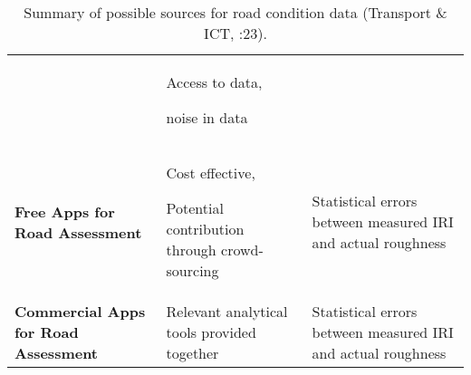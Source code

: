 \begin{table}[]
{\begin{tabular}{p{2.8cm}p{4.6cm}p{4.6cm}}
     & 
     
      Access to data,
     
     
      noise in data
     
     \\
    \textbf{Free Apps \newline for Road Assessment} & 
     
      Cost effective,
     
     
      Potential contribution through crowd-sourcing
     
     &
     
      Statistical errors between measured IRI and actual roughness
     
     \\
    \textbf{Commercial Apps for Road Assessment} & 
     
      Relevant analytical tools provided together
     
     & 
     
      Statistical errors between measured IRI and actual roughness
     
     \\
    \bottomrule
    
    
    
    \end{tabular}}
    \begin{center}
        \caption{Summary of possible sources for road condition data (Transport \& ICT, \citeyear{transportict2016}:23).}
    \end{center}
    

\end{table}
